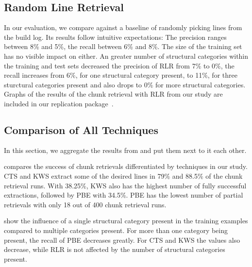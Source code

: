 \subsection{Random Line Retrieval}
\label{sec:r:rlr}

In our evaluation, we compare against a baseline of randomly
picking lines from the build log.
Its results follow intuitive
expectations:
The precision ranges between 8\% and 5\%, the recall between 6\% and
8\%.
The size of the training set has no visible impact on either.
An greater number of structural categories within the training and
test sets decreased the precision of RLR from 7\% to 0\%, the recall
increases from 6\%, for one structural category present, to 11\%, for
three sturctural categories present and also drops to 0\% for more
structural categories.
Graphs of the results of the chunk retrieval with RLR from our study
are included in our replication
package~\cite{brandt2020chunk-replication}.


\subsection{Comparison of All Techniques}
In this section, we aggregate the results from
 and put them next to it
each other.

 compares the success of chunk
retrievals differentiated by techniques in our study.
CTS and KWS
extract some of the desired lines in 79\% and 88.5\% of the chunk
retrieval runs.
With 38.25\%, KWS also has the highest number of fully
successful extractions, followed by PBE with 34.5\%.
PBE has the
lowest number of partial retrievals with only 18 out of 400 chunk
retrieval runs.


show the influence of a single structural category present in the
training examples compared to multiple categories present.
For more
than one category being present, the recall of PBE decreases greatly.
For CTS and KWS the values also decrease, while RLR is not affected by
the number of structural categories present.

